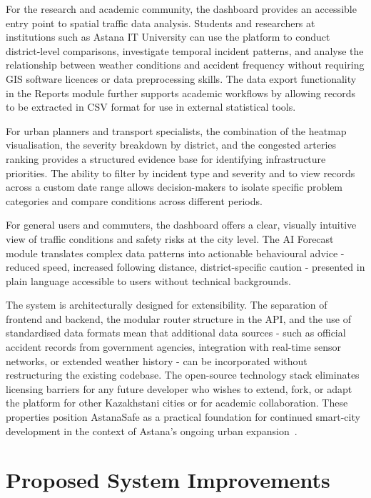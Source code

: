 \documentclass[12pt,a4paper]{report}
\begin{document}
For the research and academic community, the dashboard provides an accessible entry point to spatial traffic data analysis. Students and researchers at institutions such as Astana IT University can use the platform to conduct district-level comparisons, investigate temporal incident patterns, and analyse the relationship between weather conditions and accident frequency without requiring GIS software licences or data preprocessing skills. The data export functionality in the Reports module further supports academic workflows by allowing records to be extracted in CSV format for use in external statistical tools.

For urban planners and transport specialists, the combination of the heatmap visualisation, the severity breakdown by district, and the congested arteries ranking provides a structured evidence base for identifying infrastructure priorities. The ability to filter by incident type and severity and to view records across a custom date range allows decision-makers to isolate specific problem categories and compare conditions across different periods.

For general users and commuters, the dashboard offers a clear, visually intuitive view of traffic conditions and safety risks at the city level. The AI Forecast module translates complex data patterns into actionable behavioural advice - reduced speed, increased following distance, district-specific caution - presented in plain language accessible to users without technical backgrounds.

The system is architecturally designed for extensibility. The separation of frontend and backend, the modular router structure in the API, and the use of standardised data formats mean that additional data sources - such as official accident records from government agencies, integration with real-time sensor networks, or extended weather history - can be incorporated without restructuring the existing codebase. The open-source technology stack eliminates licensing barriers for any future developer who wishes to extend, fork, or adapt the platform for other Kazakhstani cities or for academic collaboration. These properties position AstanaSafe as a practical foundation for continued smart-city development in the context of Astana's ongoing urban expansion~\cite{praharaj2022, miranda2024}.






\chapter{Proposed System Improvements}
\end{document}
